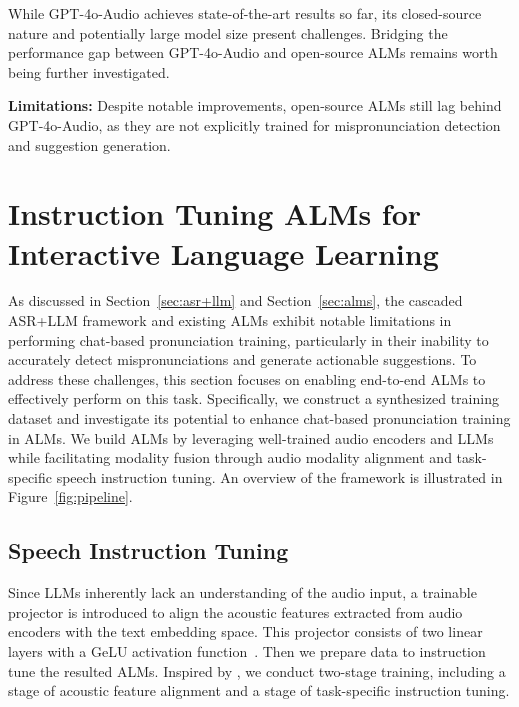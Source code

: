\documentclass[11pt]{article}
\begin{document}
While GPT-4o-Audio achieves state-of-the-art results so far, its closed-source nature and potentially large model size present challenges. Bridging the performance gap between GPT-4o-Audio and open-source ALMs remains worth being further investigated. 


\begin{abox} 
     \textbf{Limitations:} Despite notable improvements, open-source ALMs still lag behind GPT-4o-Audio, as they are not explicitly trained for mispronunciation detection and suggestion generation.
\end{abox}


\section{Instruction Tuning ALMs for Interactive Language Learning}
\label{sec:ins_alms}


As discussed in Section~\ref{sec:asr+llm} and Section~\ref{sec:alms}, the cascaded ASR+LLM framework and existing ALMs exhibit notable limitations in performing chat-based pronunciation training, particularly in their inability to accurately detect mispronunciations and generate actionable suggestions. To address these challenges, this section focuses on enabling end-to-end ALMs to effectively perform on this task. Specifically, we construct a synthesized training dataset and investigate its potential to enhance chat-based pronunciation training in ALMs. We build ALMs by leveraging well-trained audio encoders and LLMs while facilitating modality fusion through audio modality alignment and task-specific speech instruction tuning. An overview of the framework is illustrated in Figure~\ref{fig:pipeline}.

\subsection{Speech Instruction Tuning}

Since LLMs inherently lack an understanding of the audio input, a trainable projector is introduced to align the acoustic features extracted from audio encoders with the text embedding space. This projector consists of two linear layers with a GeLU activation function~\citep{hendrycks2016gaussian}. Then we prepare data to instruction tune the resulted ALMs. Inspired by \citet{DBLP:conf/nips/LiuLWL23a}, we conduct two-stage training, including a stage of acoustic feature alignment and a stage of task-specific instruction tuning. 
\end{document}
